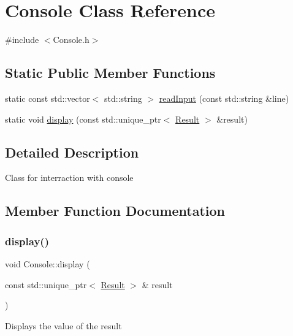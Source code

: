 \hypertarget{classConsole}{}\section{Console Class Reference}
\label{classConsole}


{\ttfamily \#include $<$Console.\+h$>$}

\subsection*{Static Public Member Functions}
\begin{DoxyCompactItemize}
\item 
static const std\+::vector$<$ std\+::string $>$ \hyperlink{classConsole_aec315361f281bda286e0c5289bd31bd4}{read\+Input} (const std\+::string \&line)
\item 
static void \hyperlink{classConsole_a0948b0ddbf96bed87afe7083f242f789}{display} (const std\+::unique\+\_\+ptr$<$ \hyperlink{classResult}{Result} $>$ \&result)
\end{DoxyCompactItemize}


\subsection{Detailed Description}
Class for interraction with console 

\subsection{Member Function Documentation}
\mbox{\label{classConsole_a0948b0ddbf96bed87afe7083f242f789}} 
\subsubsection{\texorpdfstring{display()}{display()}}
{\footnotesize\ttfamily void Console\+::display (\begin{DoxyParamCaption}\item[{const std\+::unique\+\_\+ptr$<$ \hyperlink{classResult}{Result} $>$ \&}]{result }\end{DoxyParamCaption})\hspace{0.3cm}{\ttfamily [static]}}

Displays the value of the result \mbox{\label{classConsole_aec315361f281bda286e0c5289bd31bd4}} 
